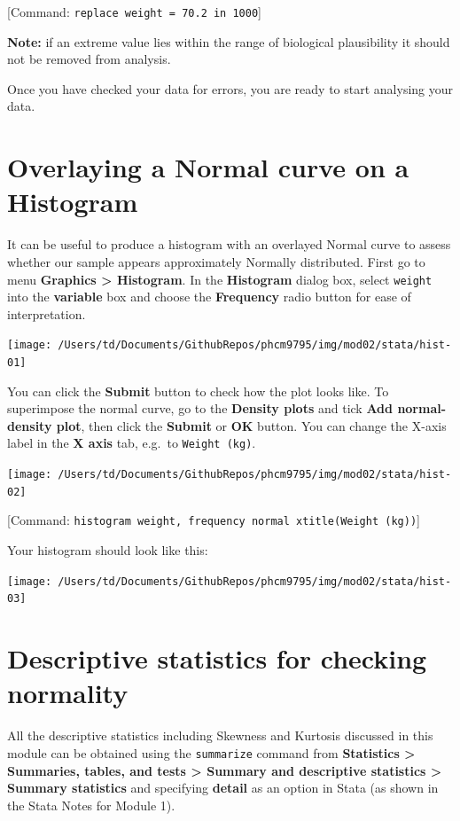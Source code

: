 \documentclass[
]{memoir}
\begin{document}
{[}Command: \texttt{replace\ weight\ =\ 70.2\ in\ 1000}{]}

\textbf{Note:} if an extreme value lies within the range of biological plausibility it should not be removed from analysis.

Once you have checked your data for errors, you are ready to start analysing your data.

\hypertarget{overlaying-a-normal-curve-on-a-histogram}{%
\section{Overlaying a Normal curve on a Histogram}\label{overlaying-a-normal-curve-on-a-histogram}}

It can be useful to produce a histogram with an overlayed Normal curve to assess whether our sample appears approximately Normally distributed. First go to menu \textbf{Graphics \textgreater{} Histogram}. In the \textbf{Histogram} dialog box, select \texttt{weight} into the \textbf{variable} box and choose the \textbf{Frequency} radio button for ease of interpretation.

\texttt{[image: /Users/td/Documents/GithubRepos/phcm9795/img/mod02/stata/hist-01]}

You can click the \textbf{Submit} button to check how the plot looks like. To superimpose the normal curve, go to the \textbf{Density plots} and tick \textbf{Add normal-density plot}, then click the \textbf{Submit} or \textbf{OK} button. You can change the X-axis label in the \textbf{X axis} tab, e.g.~to \texttt{Weight\ (kg)}.

\texttt{[image: /Users/td/Documents/GithubRepos/phcm9795/img/mod02/stata/hist-02]}

{[}Command: \texttt{histogram\ weight,\ frequency\ normal\ xtitle(Weight\ (kg))}{]}

Your histogram should look like this:

\texttt{[image: /Users/td/Documents/GithubRepos/phcm9795/img/mod02/stata/hist-03]}

\hypertarget{descriptive-statistics-for-checking-normality}{%
\section{Descriptive statistics for checking normality}\label{descriptive-statistics-for-checking-normality}}

All the descriptive statistics including Skewness and Kurtosis discussed in this module can be obtained using the \texttt{summarize} command from \textbf{Statistics \textgreater{} Summaries, tables, and tests \textgreater{} Summary and descriptive statistics \textgreater{} Summary statistics} and specifying \textbf{detail} as an option in Stata (as shown in the Stata Notes for Module 1).
\end{document}
